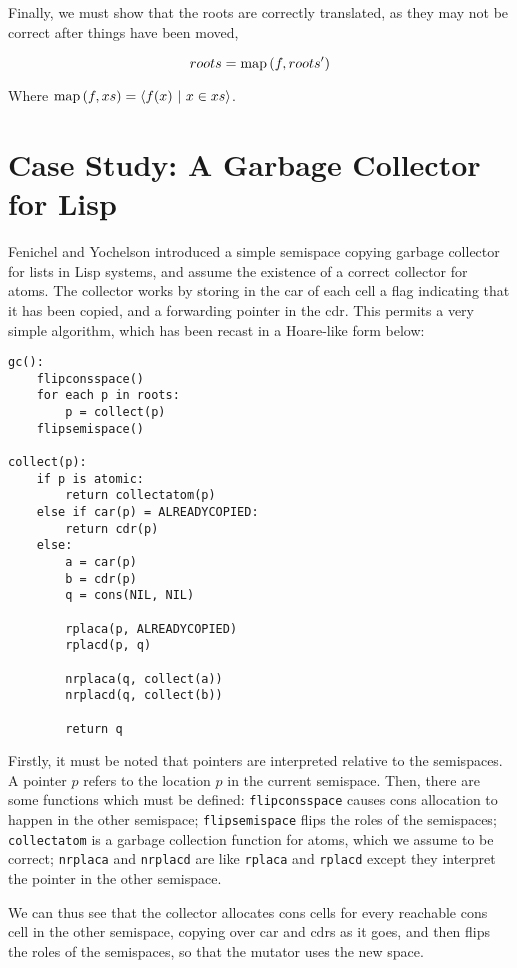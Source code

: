 Finally, we must show that the roots are correctly translated, as they
may not be correct after things have been moved,

\begin{definition}
  \label{def:c-root-translation}
  \[roots = \mathrm{map}\left(f, roots'\right)\]

  Where $\mathrm{map}\left(f, xs\right) = \langle f(x)~|~x \in xs \rangle$.
\end{definition}

\section{Case Study: A Garbage Collector for Lisp}
\label{sec:copying-example}

Fenichel and Yochelson\cite{Fenichel69} introduced a simple semispace
copying garbage collector for lists in Lisp systems, and assume the
existence of a correct collector for atoms. The collector works by
storing in the car of each cell a flag indicating that it has been
copied, and a forwarding pointer in the cdr. This permits a very
simple algorithm, which has been recast in a Hoare-like form below:

\begin{lstlisting}
gc():
    flipconsspace()
    for each p in roots:
        p = collect(p)
    flipsemispace()

collect(p):
    if p is atomic:
        return collectatom(p)
    else if car(p) = ALREADYCOPIED:
        return cdr(p)
    else:
        a = car(p)
        b = cdr(p)
        q = cons(NIL, NIL)

        rplaca(p, ALREADYCOPIED)
        rplacd(p, q)

        nrplaca(q, collect(a))
        nrplacd(q, collect(b))

        return q
\end{lstlisting}

Firstly, it must be noted that pointers are interpreted relative to
the semispaces. A pointer $p$ refers to the location $p$ in the
current semispace. Then, there are some functions which must be
defined: \texttt{flipconsspace} causes cons allocation to happen in
the other semispace; \texttt{flipsemispace} flips the roles of the
semispaces; \texttt{collectatom} is a garbage collection function for
atoms, which we assume to be correct; \texttt{nrplaca} and
\texttt{nrplacd} are like \texttt{rplaca} and \texttt{rplacd} except
they interpret the pointer in the other semispace.

We can thus see that the collector allocates cons cells for every
reachable cons cell in the other semispace, copying over car and cdrs
as it goes, and then flips the roles of the semispaces, so that the
mutator uses the new space.

